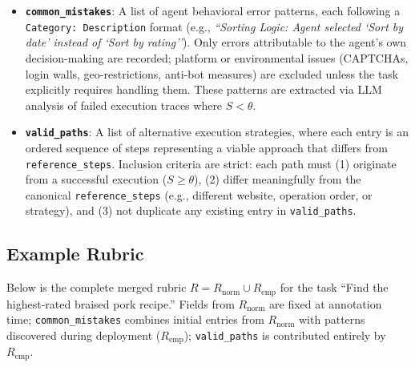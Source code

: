 \begin{itemize}[leftmargin=*]
    \item \textbf{\texttt{common\_mistakes}}: A list of agent behavioral error patterns, each following a \texttt{Category: Description} format (e.g., \textit{``Sorting Logic: Agent selected `Sort by date' instead of `Sort by rating''}). Only errors attributable to the agent's own decision-making are recorded; platform or environmental issues (CAPTCHAs, login walls, geo-restrictions, anti-bot measures) are excluded unless the task explicitly requires handling them. These patterns are extracted via LLM analysis of failed execution traces where $S < \theta$.

    \item \textbf{\texttt{valid\_paths}}: A list of alternative execution strategies, where each entry is an ordered sequence of steps representing a viable approach that differs from \texttt{reference\_steps}. Inclusion criteria are strict: each path must (1) originate from a successful execution ($S \geq \theta$), (2) differ meaningfully from the canonical \texttt{reference\_steps} (e.g., different website, operation order, or strategy), and (3) not duplicate any existing entry in \texttt{valid\_paths}.
\end{itemize}
\clearpage
\subsection{Example Rubric}

Below is the complete merged rubric $R = R_{\text{norm}} \cup R_{\text{emp}}$ for the task ``Find the highest-rated braised pork recipe.'' Fields from $R_{\text{norm}}$ are fixed at annotation time; \texttt{common\_mistakes} combines initial entries from $R_{\text{norm}}$ with patterns discovered during deployment ($R_{\text{emp}}$); \texttt{valid\_paths} is contributed entirely by $R_{\text{emp}}$.

